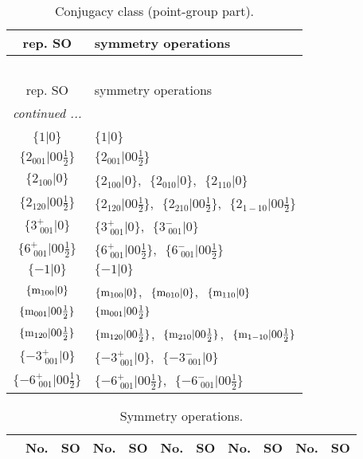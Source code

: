 \documentclass[fleqn,10pt,landscape]{article}
\begin{document}
\begin{itemize}
\begin{center}
\renewcommand{\arraystretch}{1.3}
\begin{longtable}{c|l}
\caption{Conjugacy class (point-group part).}
 \\
 \hline \hline
rep. SO & symmetry operations \\ \hline \endfirsthead

\multicolumn{1}{l}{\tablename\ \thetable{}} \\
 \hline \hline
rep. SO & symmetry operations \\ \hline \endhead

 \hline \hline
\multicolumn{1}{r}{\footnotesize\it continued ...} \\ \endfoot

 \hline \hline
\multicolumn{1}{r}{} \\ \endlastfoot

$\{1|0\}$ & $\{1|0\}$ \\ \hline
$\{2{}_{001}|0 0 \frac{1}{2}\}$ & $\{2{}_{001}|0 0 \frac{1}{2}\}$ \\ \hline
$\{2{}_{100}|0\}$ & $\{2{}_{100}|0\}$,\,\, $\{2{}_{010}|0\}$,\,\, $\{2{}_{110}|0\}$ \\ \hline
$\{2{}_{120}|0 0 \frac{1}{2}\}$ & $\{2{}_{120}|0 0 \frac{1}{2}\}$,\,\, $\{2{}_{210}|0 0 \frac{1}{2}\}$,\,\, $\{2{}_{1-10}|0 0 \frac{1}{2}\}$ \\ \hline
$\{3^{+}_{\,\,001}|0\}$ & $\{3^{+}_{\,\,001}|0\}$,\,\, $\{3^{-}_{\,\,001}|0\}$ \\ \hline
$\{6^{+}_{\,\,001}|0 0 \frac{1}{2}\}$ & $\{6^{+}_{\,\,001}|0 0 \frac{1}{2}\}$,\,\, $\{6^{-}_{\,\,001}|0 0 \frac{1}{2}\}$ \\ \hline
$\{-1|0\}$ & $\{-1|0\}$ \\ \hline
$\{{\rm m}_{100}|0\}$ & $\{{\rm m}_{100}|0\}$,\,\, $\{{\rm m}_{010}|0\}$,\,\, $\{{\rm m}_{110}|0\}$ \\ \hline
$\{{\rm m}_{001}|0 0 \frac{1}{2}\}$ & $\{{\rm m}_{001}|0 0 \frac{1}{2}\}$ \\ \hline
$\{{\rm m}_{120}|0 0 \frac{1}{2}\}$ & $\{{\rm m}_{120}|0 0 \frac{1}{2}\}$,\,\, $\{{\rm m}_{210}|0 0 \frac{1}{2}\}$,\,\, $\{{\rm m}_{1-10}|0 0 \frac{1}{2}\}$ \\ \hline
$\{-3^{+}_{\,\,001}|0\}$ & $\{-3^{+}_{\,\,001}|0\}$,\,\, $\{-3^{-}_{\,\,001}|0\}$ \\ \hline
$\{-6^{+}_{\,\,001}|0 0 \frac{1}{2}\}$ & $\{-6^{+}_{\,\,001}|0 0 \frac{1}{2}\}$,\,\, $\{-6^{-}_{\,\,001}|0 0 \frac{1}{2}\}$ \\
\end{longtable}
\end{center}
\begin{center}
\renewcommand{\arraystretch}{1.3}
\begin{longtable}{c|cc|cc|cc|cc|cc}
\caption{Symmetry operations.}
 \\
 \hline \hline
 & No. & SO & No. & SO & No. & SO & No. & SO & No. & SO \\ \hline \endfirsthead


\end{longtable}
\end{center}
\end{itemize}
\end{document}
